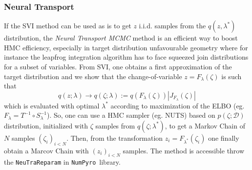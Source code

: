 \documentclass[final,5p,times,twocolumn,authoryear]{elsarticle}
\newcommand{\numpyro}{\texttt{NumPyro}}
\newcommand{\bydef}{:=}
\begin{document}
\subsubsection{Neural Transport}
\label{sec-Neural-Reparametrisation}
%
If the SVI method can be used as is to get $z$ i.i.d. samples from the $q(z,\lambda^\ast)$ distribution, the \textit{Neural Transport MCMC} method \citep{2014arXiv1412.5492P,2019arXiv190303704H} is an efficient way to boost HMC efficiency, especially in target distribution unfavourable geometry where for instance the leapfrog integration algorithm has to face squeezed join distributions for a subset of variables. From SVI, one obtains a first approximation of the target distribution and we show that the change-of-variable $z=F_\lambda(\zeta)$ is such that
\begin{equation}
q(z;\lambda) \rightarrow q(\zeta;\lambda) \bydef q(F_\lambda(\zeta)) |J_{F_\lambda}(\zeta)|
\end{equation}
which is evaluated with optimal $\lambda^\ast$ according to maximization of the ELBO (eg. $F_\lambda=T^{-1}\circ S^{-1}_\lambda$). So, one can use a HMC sampler (eg. NUTS) based on $p(\zeta;\mathcal{D})$ distribution, initialized with $\zeta$ samples from $q(\zeta;\lambda^\ast)$, to get a Markov Chain of $N$ samples $(\zeta_i)_{i<N}$. Then, from the transformation  $z_i=F_{\lambda^\ast}(\zeta_i)$ one finally obtain a Marcov Chain with $(z_i)_{i<N}$ samples. The method is accessible throw the \verb|NeuTraReparam| in \numpyro\ library.


%
\end{document}
